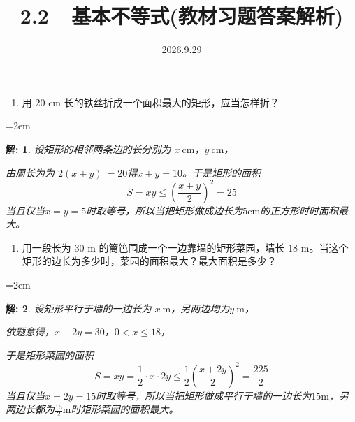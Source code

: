 \documentclass[aspectratio=169,13pt,fleqn,t] {beamer}
\title[2.2基本不等式]{2.2~~基本不等式(教材习题答案解析)}
\author[好好学习，努力向上]{}
\institute{}
\date{2026.9.29}
\newtheorem*{solve}{解:}
\begin{document}
\begin{frame}{}
	\titlepage
\end{frame}


\begin{frame}
	\begin{enumerate}[1.]
		\item 用 \(20\text{ cm}\) 长的铁丝折成一个面积最大的矩形，应当怎样折？
	\end{enumerate}

	\leftskip=2em
	\begin{minipage}{0.8\textwidth}
	
	\begin{solve}
		设矩形的相邻两条边的长分别为 $x\ \mathrm{cm}$，$y\ \mathrm{cm}$，
		
		由周长为为 $2(x+y)\ = 20$得$x+y=10$。于是矩形的面积
		\[
		S=xy \leqslant (\frac{x+y}{2})^2 =25
		\]
		当且仅当$x=y=5$时取等号，所以当把矩形做成边长为$5\mathrm{cm}$的正方形时时面积最大。		
	\end{solve}
	\end{minipage}

\end{frame}

\begin{frame}
	\begin{enumerate}[2.]
		\item 用一段长为 \(30\text{ m}\) 的篱笆围成一个一边靠墙的矩形菜园，墙长 \(18\text{ m}\)。当这个矩形的边长为多少时，菜园的面积最大？最大面积是多少？
	\end{enumerate}
	
	\leftskip=2em
	\begin{minipage}{0.8\textwidth}
		
		\begin{solve}
			设矩形平行于墙的一边长为 $x\ \mathrm{m}$，另两边均为$y\ \mathrm{m}$，
			
			依题意得，$x+2y=30$，$0<x \leqslant 18$，
			
			于是矩形菜园的面积
			\[
			S=xy =\frac{1}{2}\cdot x\cdot 2y \leqslant\frac{1}{2} \left(\frac{x+2y}{2}\right)^2 =\frac{225}{2}
			\]
			当且仅当$x=2y=15$时取等号，所以当把矩形做成平行于墙的一边长为$15\mathrm{m}$，另两边长都为$\frac{15}{2}\mathrm{m}$时矩形菜园的面积最大。		
		\end{solve}
	\end{minipage}
	
\end{frame}
\end{document}
